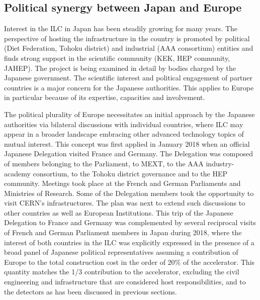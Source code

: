 \documentclass[%
 reprint,
 floatfix,
 amsmath,amssymb,
 aps,
]{revtex4-1}
\begin{document}
\subsection{\label{sec:discussionPol}Political synergy between Japan and Europe}
Interest in the ILC in Japan has been steadily growing for many years. The perspective of hosting the infrastructure in the country is promoted by political (Diet Federation, Tohoku district)
and industrial (AAA consortium) entities and finds strong support in the scientific community (KEK,
HEP community, JAHEP). The project is being examined in detail by bodies charged by the Japanese government. The scientific interest and political
engagement of partner countries is a major concern for the Japanese authorities. This
applies  to Europe in particular because of its expertise, capacities and involvement.

The political plurality of Europe necessitates an initial approach by the Japanese
authorities via bilateral discussions with individual countries, where ILC may appear in a broader
landscape embracing other advanced technology topics of mutual interest. This concept was first applied
in January 2018 when an official Japanese Delegation visited France and Germany. The Delegation
was composed of members belonging to the Parliament, to MEXT, to the AAA industry-academy
consortium, to the Tohoku district governance and to the HEP community. Meetings took place at
the French and German Parliaments and Ministries of Research. Some of the Delegation members took the opportunity
to visit CERN's infrastructures. The plan was next to extend such discussions to other countries as well as European
Institutions. This trip of the Japanese Delegation to France and Germany was complemented by several reciprocal
visits of French and German Parliament members in Japan during 2018, where the interest of
both countries in the ILC was explicitly expressed in the presence of a broad panel of Japanese political
representatives assuming a contribution of Europe to the total construction cost in the order of 20\% of the accelerator. This quantity matches the 1/3 contribution to the accelerator, excluding the civil engineering and infrastructure that are considered host responsibilities, and to the detectors as has been discussed in previous sections.
\end{document}
